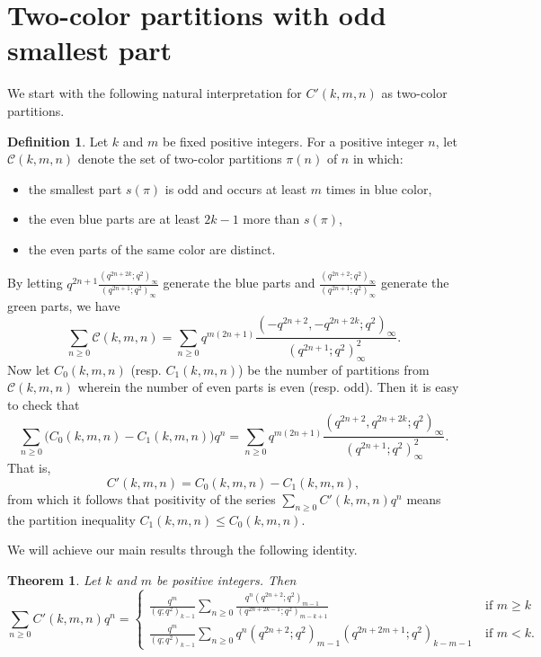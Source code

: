 \documentclass[reqno]{amsart}
\theoremstyle{definition}
\newtheorem{definition}{Definition}
\theoremstyle{plain}
\newtheorem{theorem}    {Theorem}
\theoremstyle{remark}
\numberwithin{equation}{section}
\newcommand{\fr}{\frac}
\begin{document}
\section{Two-color partitions with odd smallest part}\label{sec odd-spt}
%
We start with the following natural interpretation for $C'(k,m,n)$ as two-color partitions.
\begin{definition}
Let $k$ and $m$ be fixed positive integers. For a positive integer $n$, let $\mathcal{C}(k,m,n)$ denote the set of two-color partitions $\pi(n)$ of $n$
in which:
\begin{itemize}
\item the smallest part $s(\pi)$ is odd and occurs at least $m$ times in blue color,
\item the even blue parts are at least $2k-1$ more than $s(\pi)$,
\item the even parts of the same color are distinct.
\end{itemize}
By letting $q^{2n+1}\fr{(q^{2n+2k};q^2)_\infty}{(q^{2n+1};q^2)_\infty}$ generate the blue parts and
$\fr{(q^{2n+2};q^2)_\infty}{(q^{2n+1};q^2)_\infty}$ generate the green parts, we have
\[
\sum_{n\geq 0} \mathcal{C}(k,m,n)
=\sum_{n\geq 0} q^{m(2n+1)} \fr{(-q^{2n+2},-q^{2n+2k};q^2)_\infty}{(q^{2n+1};q^2)_\infty^2}.
\]
Now let $C_0(k,m,n)$ (resp. $C_1(k,m,n)$) be the
number of partitions from $\mathcal{C}(k,m,n)$ wherein the number of even parts is even (resp. odd).
Then it is easy to check that
\begin{equation}\label{gen C'}
\sum_{n\geq 0}  \big( C_0(k,m,n)-C_1(k,m,n) \big) q^n
= \sum_{n\geq 0} q^{m(2n+1)} \fr{(q^{2n+2},q^{2n+2k};q^2)_\infty}{(q^{2n+1};q^2)_\infty^2}.
\end{equation}
That is,
\[
C'(k,m,n)= C_0(k,m,n)-C_1(k,m,n),
\]
from which it follows that positivity of the series $\sum_{n\geq 0} C'(k,m,n) q^n$ means the partition inequality
$C_1(k,m,n) \leq C_0(k,m,n)$.
\end{definition}
%
We will achieve our main results through the following identity.
%
\begin{theorem}\label{thm C'}
Let $k$ and $m$ be positive integers. Then
\[
\sum_{n\geq 0}C'(k,m,n) q^n
=\begin{cases}
\fr{q^m}{(q;q^2)_{k-1}} \displaystyle \sum_{n\geq 0}\fr{q^n (q^{2n+2};q^2)_{m-1}}{(q^{2n+2k-1};q^2)_{m-k+1}}
&\ \text{if $m\geq k$} \\
\fr{q^m}{(q;q^2)_{k-1}} \displaystyle \sum_{n\geq 0} q^n (q^{2n+2};q^2)_{m-1}(q^{2n+2m+1};q^2)_{k-m-1}
&\ \text{if $m<k$}.
\end{cases}
\]
\end{theorem}
\end{document}
